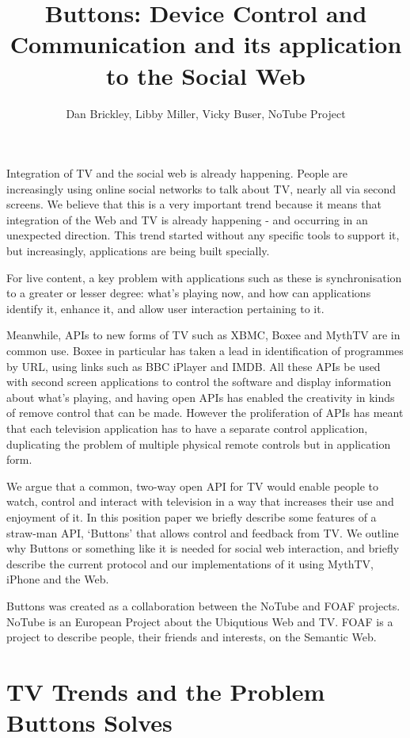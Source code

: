 \documentclass[]{article}%
\title{Buttons: Device Control and Communication and its application to the Social Web}
\author{Dan Brickley, Libby Miller, Vicky Buser, NoTube Project}
\begin{document}
\ifpdf
{}
\else
{}
\fi

\maketitle

Integration of TV and the social web is already happening. People are increasingly using online social networks to talk about TV, nearly all via second screens.  We believe that this is a very important trend because it means that integration of the Web and TV is already happening - and occurring in an unexpected direction. This trend started without any specific tools to support it, but increasingly, applications are being built specially.  

For live content, a key problem with applications such as these is synchronisation to a greater or lesser degree: what's playing now, and how can applications identify it, enhance it, and allow user interaction pertaining to it.

Meanwhile, APIs to new forms of TV such as XBMC, Boxee and MythTV are in common use. Boxee in particular has taken a lead in identification of programmes by URL, using links such as BBC iPlayer and IMDB. All these APIs be used with second screen applications to control the software and display information about what's playing, and having open APIs has enabled the creativity in kinds of remove control that can be made. However the proliferation of APIs has meant that each television application has to have a separate control application, duplicating the problem of multiple physical remote controls but in application form.

We argue that a common, two-way open API for TV would enable people to watch, control and interact with television in a way that increases their use and enjoyment of it.  In this position paper we briefly describe some features of a straw-man API,  `Buttons' that allows control and feedback from TV. We outline why Buttons or something like it is needed for social web interaction, and briefly describe the current protocol and our implementations of it using MythTV, iPhone and the Web.

Buttons was created as a collaboration between the NoTube and FOAF projects. NoTube is an European Project about the Ubiqutious Web and TV. FOAF is a project to describe people, their friends and interests, on the Semantic Web.

\section{TV Trends and the Problem Buttons Solves}
\end{document}
